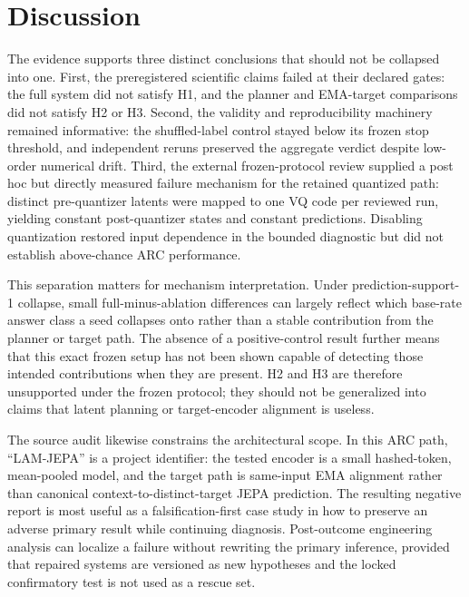 \documentclass[11pt]{article}
\begin{document}
\section{Discussion}
The evidence supports three distinct conclusions that should not be collapsed into one. First, the preregistered scientific claims failed at their declared gates: the full system did not satisfy H1, and the planner and EMA-target comparisons did not satisfy H2 or H3. Second, the validity and reproducibility machinery remained informative: the shuffled-label control stayed below its frozen stop threshold, and independent reruns preserved the aggregate verdict despite low-order numerical drift. Third, the external frozen-protocol review supplied a post hoc but directly measured failure mechanism for the retained quantized path: distinct pre-quantizer latents were mapped to one VQ code per reviewed run, yielding constant post-quantizer states and constant predictions. Disabling quantization restored input dependence in the bounded diagnostic but did not establish above-chance ARC performance.

This separation matters for mechanism interpretation. Under prediction-support-1 collapse, small full-minus-ablation differences can largely reflect which base-rate answer class a seed collapses onto rather than a stable contribution from the planner or target path. The absence of a positive-control result further means that this exact frozen setup has not been shown capable of detecting those intended contributions when they are present. H2 and H3 are therefore unsupported under the frozen protocol; they should not be generalized into claims that latent planning or target-encoder alignment is useless.

The source audit likewise constrains the architectural scope. In this ARC path, ``LAM-JEPA'' is a project identifier: the tested encoder is a small hashed-token, mean-pooled model, and the target path is same-input EMA alignment rather than canonical context-to-distinct-target JEPA prediction. The resulting negative report is most useful as a falsification-first case study in how to preserve an adverse primary result while continuing diagnosis. Post-outcome engineering analysis can localize a failure without rewriting the primary inference, provided that repaired systems are versioned as new hypotheses and the locked confirmatory test is not used as a rescue set.
\end{document}
